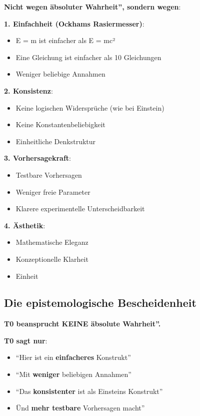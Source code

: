 	\textbf{Nicht wegen äbsoluter Wahrheit'', sondern wegen}:
	
	\textbf{1. Einfachheit (Ockhams Rasiermesser)}:
	\begin{itemize}
		\item E = m ist einfacher als E = mc²
		\item Eine Gleichung ist einfacher als 10 Gleichungen
		\item Weniger beliebige Annahmen
	\end{itemize}
	
	\textbf{2. Konsistenz}:
	\begin{itemize}
		\item Keine logischen Widersprüche (wie bei Einstein)
		\item Keine Konstantenbeliebigkeit
		\item Einheitliche Denkstruktur
	\end{itemize}
	
	\textbf{3. Vorhersagekraft}:
	\begin{itemize}
		\item Testbare Vorhersagen
		\item Weniger freie Parameter
		\item Klarere experimentelle Unterscheidbarkeit
	\end{itemize}
	
	\textbf{4. Ästhetik}:
	\begin{itemize}
		\item Mathematische Eleganz
		\item Konzeptionelle Klarheit
		\item Einheit
	\end{itemize}
	
	\subsection{Die epistemologische Bescheidenheit}
	
	\textbf{T0 beansprucht KEINE äbsolute Wahrheit''.}
	
	\textbf{T0 sagt nur}:
	\begin{itemize}
		\item ``Hier ist ein \textbf{einfacheres} Konstrukt''
		\item ``Mit \textbf{weniger} beliebigen Annahmen''
		\item ``Das \textbf{konsistenter} ist als Einsteins Konstrukt''
		\item Ünd \textbf{mehr testbare} Vorhersagen macht''
	\end{itemize}
	
